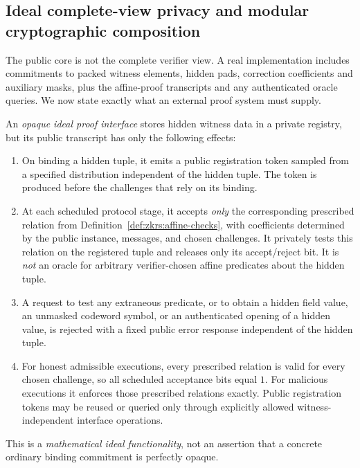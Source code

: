 \subsection{Ideal complete-view privacy and modular cryptographic composition}\label{sec:zkrs:composition}
The public core is not the complete verifier view.
A real implementation includes commitments to packed witness elements,
hidden pads, correction coefficients and auxiliary masks, plus the
affine-proof transcripts and any authenticated oracle queries.
We now state exactly what an external proof system must supply.

\begin{definition}\label{def:zkrs:ideal-func}
An \emph{opaque ideal proof interface} stores hidden witness data in a
private registry, but its public transcript has only the following effects:
\begin{enumerate}[label=\textup{(\roman*)}]
\item On binding a hidden tuple, it emits a public registration token
sampled from a specified distribution independent of the hidden tuple.
The token is produced before the challenges that rely on its binding.
\item At each scheduled protocol stage, it accepts \emph{only}
the corresponding prescribed relation from
Definition~\ref{def:zkrs:affine-checks},
with coefficients determined by the public instance,
messages, and chosen challenges.
It privately tests this relation on the registered tuple
and releases only its accept/reject bit.
It is \emph{not} an oracle for arbitrary verifier-chosen
affine predicates about the hidden tuple.
\item A request to test any extraneous predicate, or to obtain
a hidden field value, an unmasked codeword symbol, or an
authenticated opening of a hidden value, is rejected with a
fixed public error response independent of the hidden tuple.
\item For honest admissible executions, every prescribed
relation is valid for every chosen challenge, so all
scheduled acceptance bits equal $1$.
For malicious executions it enforces those prescribed
relations exactly. Public registration tokens may be
reused or queried only through explicitly allowed
witness-independent interface operations.
\end{enumerate}
This is a \emph{mathematical ideal functionality}, not an assertion
that a concrete ordinary binding commitment is perfectly opaque.
\end{definition}

